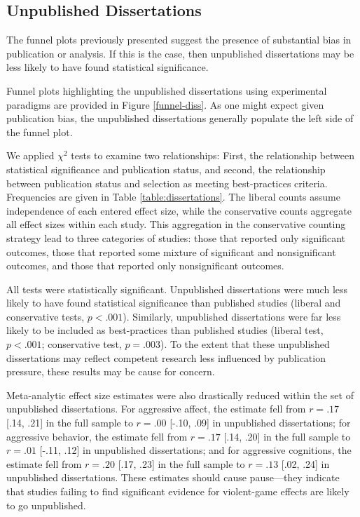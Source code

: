 \documentclass[man, mask]{apa6}
\begin{document}
\subsection{Unpublished Dissertations}
The funnel plots previously presented suggest the presence of substantial bias in publication or analysis. If this is the case, then unpublished dissertations may be less likely to have found statistical significance. 

Funnel plots highlighting the unpublished dissertations using experimental paradigms are provided in Figure \ref{funnel-diss}. As one might expect given publication bias, the unpublished dissertations generally populate the left side of the funnel plot. 

We applied $\chi^2$ tests to examine two relationships: First, the relationship between statistical significance and publication status, and second, the relationship between publication status and selection as meeting best-practices criteria. Frequencies are given in Table \ref{table:dissertations}. The liberal counts assume independence of each entered effect size, while the conservative counts aggregate all effect sizes within each study. This aggregation in the conservative counting strategy lead to three categories of studies: those that reported only significant outcomes, those that reported some mixture of significant and nonsignificant outcomes, and those that reported only nonsignificant outcomes.

All tests were statistically significant. Unpublished dissertations were much less likely to have found statistical significance than published studies (liberal and conservative tests, $p < .001$).
Similarly, unpublished dissertations were far less likely to be included as best-practices than published studies (liberal test, $p < .001$; conservative test, $p = .003$). 
To the extent that these unpublished dissertations may reflect competent research less influenced by publication pressure, these results may be cause for concern.

Meta-analytic effect size estimates were also drastically reduced within the set of unpublished dissertations. For aggressive affect, the estimate fell from $r = .17$ [.14, .21] in the full sample to $r = .00$ [-.10, .09] in unpublished dissertations; for aggressive behavior, the estimate fell from $r = .17$ [.14, .20] in the full sample to $r = .01$ [-.11, .12] in unpublished dissertations; and for aggressive cognitions, the estimate fell from $r = .20$ [.17, .23] in the full sample to $r =  .13$ [.02, .24] in unpublished dissertations.  These estimates should cause pause---they indicate that studies failing to find significant evidence for violent-game effects are likely to go unpublished.
\end{document}
